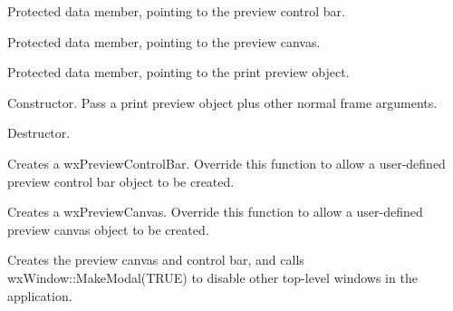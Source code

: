 

Protected data member, pointing to the preview control bar.



Protected data member, pointing to the preview canvas.



Protected data member, pointing to the print preview object.



Constructor. Pass a print preview object plus other normal frame arguments.



Destructor. 



Creates a wxPreviewControlBar. Override this function to allow
a user-defined preview control bar object to be created.



Creates a wxPreviewCanvas. Override this function to allow
a user-defined preview canvas object to be created.



Creates the preview canvas and control bar, and calls
wxWindow::MakeModal(TRUE) to disable other top-level windows
in the application.

